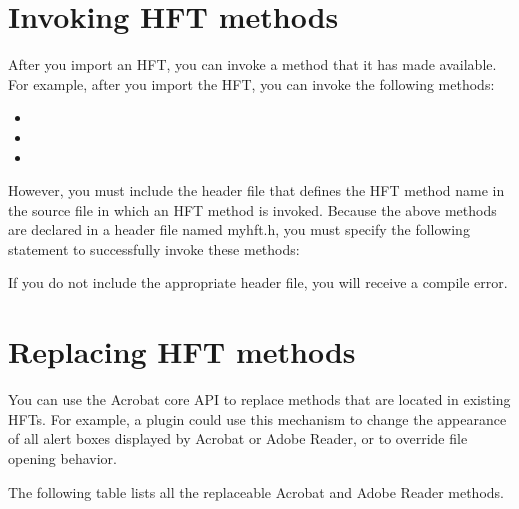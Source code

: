\documentclass[letterpaper,12pt,english,openany,oneside]{sphinxmanual}
\begin{document}
\section{Invoking HFT methods}
\label{\detokenize{Plugins_Hft:invoking-hft-methods}}
After you import an HFT, you can invoke a method that it has made available. For example, after you import the  HFT, you can invoke the following methods:
\begin{itemize}
\item {} 

\item {} 

\item {} 

\end{itemize}

However, you must include the header file that defines the HFT method name in the source file in which an HFT method is invoked. Because the above methods are declared in a header file named myhft.h, you must specify the following statement to successfully invoke these methods:

\begin{sphinxVerbatim}[commandchars=\\\{\}]
\end{sphinxVerbatim}

If you do not include the appropriate header file, you will receive a compile error.


\section{Replacing HFT methods}
\label{\detokenize{Plugins_Hft:replacing-hft-methods}}
You can use the Acrobat core API to replace methods that are located in existing HFTs. For example, a plugin could use this mechanism to change the appearance of all alert boxes displayed by Acrobat or Adobe Reader, or to override file opening behavior.

The following table lists all the replaceable Acrobat and Adobe Reader methods.
\end{document}
